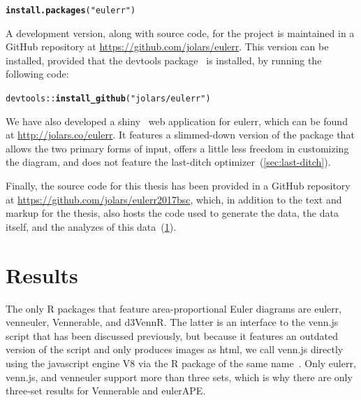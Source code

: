 \documentclass[
  oneside,
  openany,
  numbers=noendperiod,
  parskip=half,
  bibliography=totoc
]{scrbook}\usepackage[]{graphicx}\usepackage{xcolor}
\makeatletter
\newcommand{\hlstr}[1]{\textcolor[rgb]{0.192,0.494,0.8}{#1}}%
\newcommand{\hlopt}[1]{\textcolor[rgb]{0,0,0}{#1}}%
\newcommand{\hlstd}[1]{\textcolor[rgb]{0.345,0.345,0.345}{#1}}%
\newcommand{\hlkwd}[1]{\textcolor[rgb]{0.737,0.353,0.396}{\textbf{#1}}}%
\newenvironment{kframe}{%
 \def\at@end@of@kframe{}%
 \ifinner\ifhmode%
  \def\at@end@of@kframe{\end{minipage}}%
  \begin{minipage}{\columnwidth}%
 \fi\fi%
 \def\FrameCommand##1{\hskip\@totalleftmargin \hskip-\fboxsep
 \colorbox{shadecolor}{##1}\hskip-\fboxsep
     \hskip-\linewidth \hskip-\@totalleftmargin \hskip\columnwidth}%
 \MakeFramed {\advance\hsize-\width
   \@totalleftmargin\z@ \linewidth\hsize
   \@setminipage}}%
 {\par\unskip\endMakeFramed%
 \at@end@of@kframe}
\newenvironment{knitrout}{}{} %
\newcommand{\proglang}[1]{\textsf{#1}}
\newcommand{\pkg}[1]{{\fontseries{b}\selectfont #1}}
\makeatother
\begin{document}
\begin{knitrout}\small
{}\color{fgcolor}\begin{kframe}
\begin{alltt}
\hlkwd{install.packages}\hlstd{(}\hlstr{"eulerr"}\hlstd{)}
\end{alltt}
\end{kframe}
\end{knitrout}

A development version, along with source code, for the project is maintained in
a GitHub repository at
\url{https://github.com/jolars/eulerr}. This version
can be installed, provided that the \pkg{devtools} package~\citep{Wickham_2017} is installed,
by running the following code:

\begin{knitrout}\small
{}\color{fgcolor}\begin{kframe}
\begin{alltt}
\hlstd{devtools}\hlopt{::}\hlkwd{install_github}\hlstd{(}\hlstr{"jolars/eulerr"}\hlstd{)}
\end{alltt}
\end{kframe}
\end{knitrout}

We have also developed a \pkg{shiny}~\citep{Chang_2017} web application for
\pkg{eulerr}, which can be found at \url{http://jolars.co/eulerr}. It features
a slimmed-down version of the package that
allows the two primary forms of input, offers a little less freedom in customizing the
diagram, and does not feature the last-ditch optimizer~(\cref{sec:last-ditch}).

Finally, the source code for this thesis has been provided in a GitHub
repository at
\url{https://github.com/jolars/eulerr2017bsc}, which, in addition to the
text and markup for the thesis, also hosts the code used to generate the
data, the data itself, and the analyzes of this data~(\cref{ch:results}).

\chapter{Results}
\label{ch:results}

The only R packages that feature area-proportional Euler diagrams are
\pkg{eulerr}, \pkg{venneuler}, \pkg{Vennerable}, and \pkg{d3VennR}. The latter
is an interface to the \pkg{venn.js} script that has been discussed previously,
but because it features an outdated version of the script and only produces
images as \proglang{html}, we call \pkg{venn.js} directly using the \proglang{javascript}
engine \pkg{V8} via the R package of the same name~\citep{Ooms_2017}.
Only \pkg{eulerr}, \pkg{venn.js}, and \pkg{venneuler} support more than three
sets, which is why there are only three-set results for \pkg{Vennerable} and
\pkg{eulerAPE}.
\end{document}
